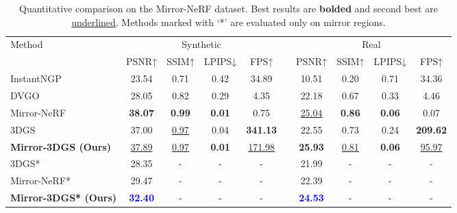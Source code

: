 \begin{table}[tb]
  \caption{Quantitative comparison on the Mirror-NeRF dataset. Best results are \textbf{bolded} and second best are \underline{underlined}. Methods marked with `*' are evaluated only on mirror regions.}
  \label{table:complete_test_comparison}
  \centering
  \scriptsize
  \begin{tabular}{lccccccccc}
    \toprule
    \multirow{2}{*}{Method} & \multicolumn{4}{c}{Synthetic} && \multicolumn{4}{c}{Real} \\
    \cmidrule{2-5} \cmidrule{7-10}
    & PSNR↑ & SSIM↑ & LPIPS↓ & FPS↑ && PSNR↑ & SSIM↑ & LPIPS↓ & FPS↑ \\
    \cmidrule{2-5} \cmidrule{7-10}
    InstantNGP~\cite{muller2022instant} & 23.54 & 0.71 & 0.42 & 34.89 && 10.51 & 0.20 & 0.71 & 34.36 \\
    DVGO~\cite{sun2022direct} & 28.05 & 0.82 & 0.29 & 4.35 && 22.18 & 0.67 & 0.33 & 4.46 \\
    Mirror-NeRF~\cite{zeng2023mirror} & \textbf{38.07} & \textbf{0.99} & \textbf{0.01} & 0.75 && \underline{25.04} & \textbf{0.86} & \textbf{0.06} & 0.07 \\
    \midrule
    3DGS~\cite{3dgs} & 37.00 & \underline{0.97} & 0.04 & \textbf{341.13} && 22.55 & 0.73 & 0.24 & \textbf{209.62} \\
    \textbf{Mirror-3DGS (Ours)} & \underline{37.89} & \underline{0.97} & \textbf{0.01} & \underline{171.98} && \textbf{25.93} & \underline{0.81} & \textbf{0.06} & \underline{95.97} \\
    \midrule
    3DGS*~\cite{3dgs} & 28.35 & - & - & - && 21.99 & - & - & - \\
    Mirror-NeRF*~\cite{zeng2023mirror} & 29.47 & - & - & - && 22.39 & - & - & - \\
    \textbf{Mirror-3DGS* (Ours)} & \textcolor{blue}{\textbf{32.40}} & - & - & - && \textcolor{blue}{\textbf{24.53}} & - & - & - \\
    \bottomrule
  \end{tabular}
\vspace{-3mm}
\end{table}